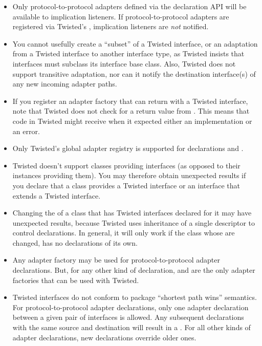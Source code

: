 \begin{verbatim%
}
\begin{verbatim%
}
\begin{verbatim%
}
\begin{verbatim%
}
\begin{verbatim%
}
\begin{verbatim%
}
\begin{itemize}

\item Only protocol-to-protocol adapters defined via the 
declaration API will be available to implication listeners.  If
protocol-to-protocol adapters are registered via Twisted's
, implication listeners are \emph{not} notified.

\item You cannot usefully create a ``subset'' of a Twisted interface, or an
adaptation from a Twisted interface to another interface type, as Twisted
insists that interfaces must subclass its interface base class.  Also, Twisted
does not support transitive adaptation, nor can it notify the destination
interface(s) of any new incoming adapter paths.

\item If you register an adapter factory that can return  with
a Twisted interface, note that Twisted does not check for a  return
value from .  This means that code in Twisted might
receive  when it expected either an implementation or an error.

\item Only Twisted's global adapter registry is supported for declarations and
.

\item Twisted doesn't support classes providing interfaces (as opposed to their
instances providing them).  You may therefore obtain unexpected results if you
declare that a class provides a Twisted interface or an interface that extends a
Twisted interface.

\item Changing the  of a class that has Twisted interfaces
declared for it may have unexpected results, because Twisted uses inheritance of
a single descriptor to control declarations.  In general, it will only work if
the class whose  are changed, has no declarations of its own.



\item Any adapter factory may be used for protocol-to-protocol adapter
declarations.  But, for any other kind of declaration,
 and  are the only
adapter factories that can be used with Twisted.

\item Twisted interfaces do not conform to  package ``shortest
path wins'' semantics.  For protocol-to-protocol adapter declarations, only one
adapter declaration between a given pair of interfaces is allowed.  Any
subsequent declarations with the same source and destination will result in
a .  For all other kinds of adapter declarations, new
declarations override older ones.


\end{itemize}
\end{verbatim%
}
\end{verbatim%
}
\end{verbatim%
}
\end{verbatim%
}
\end{verbatim%
}
\end{verbatim%
}
